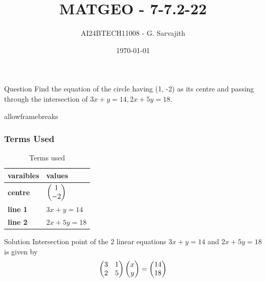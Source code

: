 \documentclass{beamer}
\begin{document}
\title{MATGEO - 7-7.2-22}
\author{AI24BTECH11008 - G. Sarvajith}
\date{\today}
\frame{\titlepage}

\begin{frame}{Question}
    Find the equation of the circle having (1, -2) as its centre and passing through the
    intersection of $3x + y = 14, 2x + 5y = 18$.
\end{frame}

\begin{frame}{allowframebreaks}
\frametitle{Terms Used}
\begin{table}[htbp]
    \centering
    \caption{Terms used}
    \label{tab:parameters}
    \begin{tabular}{|p{1.7cm}|p{4cm}|}
        \hline
        \textbf{varaibles} & \textbf{values}\\
        \hline
        \textbf{centre} & $\begin{pmatrix}1\\-2\end{pmatrix}$\\
        \hline
        \textbf{line 1} & $3x + y = 14$\\
        \hline
        \textbf{line 2} & $2x + 5y = 18$\\
        \hline
    \end{tabular}
\end{table}
\end{frame}
\begin{frame}{Solution}
    Intersection point of the 2 linear equations $3x + y = 14$ and $2x + 5y = 18$ is given by\\
    \begin{align*}
    \begin{pmatrix}3 & 1\\2 & 5\end{pmatrix}\begin{pmatrix}x \\ y\end{pmatrix} = \begin{pmatrix}14\\18\end{pmatrix}\\
    \end{align*}  
\end{frame}
\end{document}
